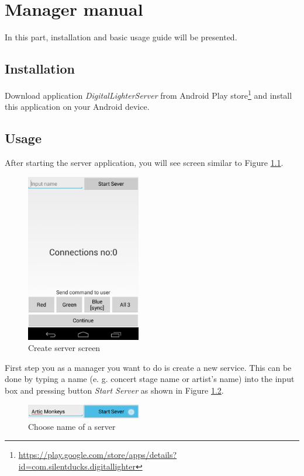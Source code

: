 \chapter{Manager manual}
In this part, installation and basic usage guide will be presented.
\section{Installation}
Download application \emph{DigitalLighterServer} from Android Play store\footnote{\url{https://play.google.com/store/apps/details?id=com.silentducks.digitallighter}} and install this application on your Android device.
\section{Usage}
After starting the server application, you will see screen similar to Figure \ref{fig:manual_server0}.
\begin{figure}[h]
	\centering
		\includegraphics[width=5cm]{appendix/server0.png}
	\caption{Create server screen}
	\label{fig:manual_server0}
\end{figure}

First step you as a manager you want to do is create a new service.
This can be done by typing a name (e. g. concert stage name or artist's name) into the input box and pressing button \emph{Start Server} as shown in Figure \ref{fig:manual_server1}.

\begin{figure}[h]
	\centering
		\includegraphics[width=5cm]{appendix/server2.png}
	\caption{Choose name of a server}
	\label{fig:manual_server1}
\end{figure}


